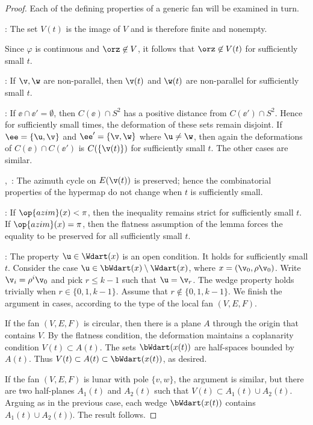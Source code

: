 \begin{proof} Each of the defining properties of a generic  fan will be
examined in turn.

: The set $V(t)$ is the image of $V$ and is therefore finite
and nonempty.  

 Since $\varphi$ is continuous and
$\orz\not\in V$, it follows that $\orz\not\in V(t)$ for sufficiently
small $t$.

: If $\v,\w$ are non-parallel, then $\v(t)$ and
$\w(t)$ are non-parallel for sufficiently small $t$.

: If $\ee \cap \ee'=\emptyset$, then $C(\ee)\cap
S^2$ has a positive distance from $C(\ee')\cap S^2$.  Hence for
sufficiently small times, the deformation of these sets remain
disjoint.  If $\ee=\{\u,\v\}$ and $\ee'=\{\v,\w\}$ where $\u\ne\w$,
then again the deformations of $C(\ee)\cap C(\ee')$ is
$C(\{\v(t)\})$ for sufficiently small $t$.  The other cases are
similar.

,~: The azimuth cycle on $E(\v(t))$
is preserved; hence the combinatorial properties of the hypermap do
not change when $t$ is sufficiently small.

: If $\op{azim}(x)<\pi$, then the inequality remains
strict for sufficiently small $t$.  If $\op{azim}(x)=\pi$, then the
flatness assumption of the lemma forces the equality to be
preserved for all sufficiently small $t$.

: The property $\u\in \Wdart(x)$ is an open condition.
It holds for sufficiently small $t$. Consider the case $\u\in
\bWdart(x)\setminus \Wdart(x)$, where $x= (\v_0,\rho\v_0)$.  Write
$\v_i = \rho^i\v_0$ and pick $r\le k-1$ such that $\u = \v_r$.  The
wedge property holds trivially when $r\in\{0,1,k-1\}$. Assume that
$r\not\in\{0,1,k-1\}$.  We finish the argument in cases, according to 
the type of the local fan  $(V,E,F)$.

If the  fan $(V,E,F)$ is circular, then there is a plane $A$ through the origin
that contains $V$.  By the flatness condition, the deformation maintains
a coplanarity condition $V(t)\subset A(t)$.  The sets $\bWdart(x(t))$ are half-spaces
bounded by $A(t)$.  Thus $V(t)\subset A(t)\subset \bWdart(x(t))$, as desired.

If the fan $(V,E,F)$ is lunar with pole $\{v,w\}$, 
the argument is similar, but there are two half-planes
$A_1(t)$ and $A_2(t)$  such that $V(t)\subset A_1(t)\cup A_2(t)$.  Arguing as
in the previous case, each wedge $\bWdart(x(t))$ 
contains $A_1(t)\cup A_2(t))$.  The result follows.


\end{proof}

